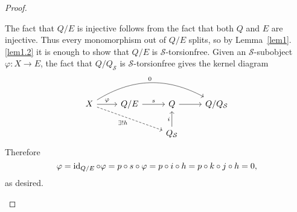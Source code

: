 \documentclass[dissertation.tex]{subfiles}
\begin{document}
\begin{prop}
\begin{proof}
\begin{enumerate}
      The fact that $Q/E$ is injective follows from the fact that both $Q$ and $E$ are injective.
      Thus every monomorphism out of $Q/E$ splits, so by Lemma~\ref{lem1}.\ref{lem1.2} it is enough to show that $Q/E$ is $\mathcal{S}$-torsionfree.
      Given an $\mathcal{S}$-subobject $\varphi \colon X \rightarrow E$, the fact that $Q/Q_\mathcal{S}$ is $\mathcal{S}$-torsionfree gives the kernel diagram
      $$\begin{tikzcd}
        X \arrow[swap,dashed]{rrd}{\exists !h}\arrow[bend left]{rrr}{0} \arrow{r}{\varphi} & Q/E \arrow{r}{s} & Q \arrow{r} & Q/Q_\mathcal{S}\\
        & & Q_\mathcal{S}\arrow{u}{i}
      \end{tikzcd}$$
      Therefore
      $$\varphi = \operatorname{id}_{Q/E} \circ \varphi = p \circ s \circ \varphi = p \circ i \circ h = p \circ k \circ j \circ h = 0,$$
      as desired.
    \end{enumerate}
  \end{proof}
\end{prop}
\end{document}
